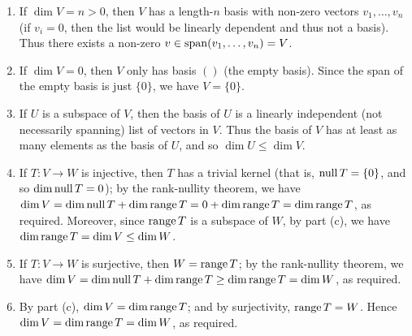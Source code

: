 \documentclass{review-sheet}
\begin{document}
\begin{solution}
  \begin{enumerate}[label=(\alph*)]
    \item If $\dim V = n > 0$, then $V$ has a length-$n$ basis with non-zero vectors $
      v_1,\ldots,v_n$ (if $v_i=0$, then the list would be linearly dependent and thus not a basis).
      Thus there exists a non-zero $v\in \operatorname{span}(v_1,\ldots,v_n)=V$.
    \item If $\dim V = 0$, then $V$ only has basis $()$ (the empty basis). Since the span of the
      empty basis is just $\{ 0 \}$, we have $V=\{ 0 \}$. 
    \item If $U$ is a subspace of $V$, then the basis of $U$ is a linearly independent (not
      necessarily spanning) list of vectors in $V$. Thus the basis of $V$ has at least as many
      elements as the basis of $U$, and so $\dim U \le \dim V$.
    \item If $T:V\to W$ is injective, then $T$ has a trivial kernel (that is, $\operatorname{null}{T}=\{ 0 \}$,
      and so $\dim\operatorname{null}{T}=0$); by the rank-nullity theorem, we have $\dim V = \dim\operatorname{null}{T} +
      \dim\operatorname{range}{T}=0+\dim{\operatorname{range}{T}}=\dim\operatorname{range}{T}$, as required. Moreover, since $ \operatorname{range} T$ is a
      subspace of $W$, by part (c), we have $\dim\operatorname{range}{T}=\dim{V}\le \dim{W}$.
    \item If $T:V\to W$ is surjective, then $W=\operatorname{range}{T}$; by the rank-nullity theorem, we have
        $\dim{V}=\dim\operatorname{null}{T}+\dim\operatorname{range}{T}\ge \dim\operatorname{range}{T}=\dim{W}$, as required.
      \item By part (c), $\dim V = \dim\operatorname{range} T$; and by surjectivity, $\operatorname{range} T = W$. Hence $\dim V
        = \dim \operatorname{range} T = \dim W$, as required.
  \end{enumerate}
\end{solution}
\end{document}
